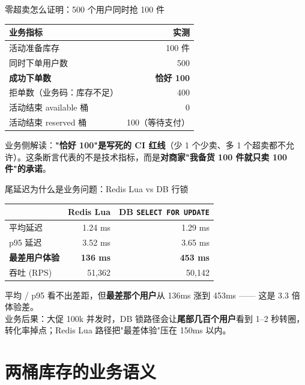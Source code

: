 \documentclass[aspectratio=169,11pt]{beamer}
\begin{document}
\begin{frame}[shrink]{零超卖怎么证明：500 个用户同时抢 100 件}
\begin{tabular}{@{}lr@{}}
\toprule
业务指标 & 实测 \\
\midrule
活动准备库存 & 100 件 \\
同时下单用户数 & 500 \\
\textbf{成功下单数} & \textbf{恰好 100} \\
拒单数（业务码：库存不足） & 400 \\
活动结束 available 桶 & 0 \\
活动结束 reserved 桶 & 100（等待支付） \\
\bottomrule
\end{tabular}
\vspace{2mm}
\small 业务侧解读：\textbf{"恰好 100"是写死的 CI 红线}（少 1 个少卖、多 1 个超卖都不允许）。这条断言代表的不是技术指标，而是\textbf{对商家"我备货 100 件就只卖 100 件"的承诺}。
\end{frame}

\begin{frame}[shrink]{尾延迟为什么是业务问题：Redis Lua vs DB 行锁}
\begin{tabular}{@{}lrr@{}}
\toprule
& Redis Lua & DB \texttt{SELECT FOR UPDATE} \\
\midrule
平均延迟 & 1.24 ms & 1.29 ms \\
p95 延迟 & 3.52 ms & 3.65 ms \\
\textbf{最差用户体验} & \textbf{136 ms} & \textbf{453 ms} \\
吞吐 (RPS) & 51{,}362 & 50{,}142 \\
\bottomrule
\end{tabular}
\vspace{2mm}
\small 平均 / p95 看不出差距，但\textbf{最差那个用户}从 136ms 涨到 453ms —— 这是 3.3 倍体验差。\\
业务后果：大促 100k 并发时，DB 锁路径会让\textbf{尾部几百个用户}看到 1--2 秒转圈，转化率掉点；Redis Lua 路径把"最差体验"压在 150ms 以内。
\end{frame}

\section{两桶库存的业务语义}
\end{document}
